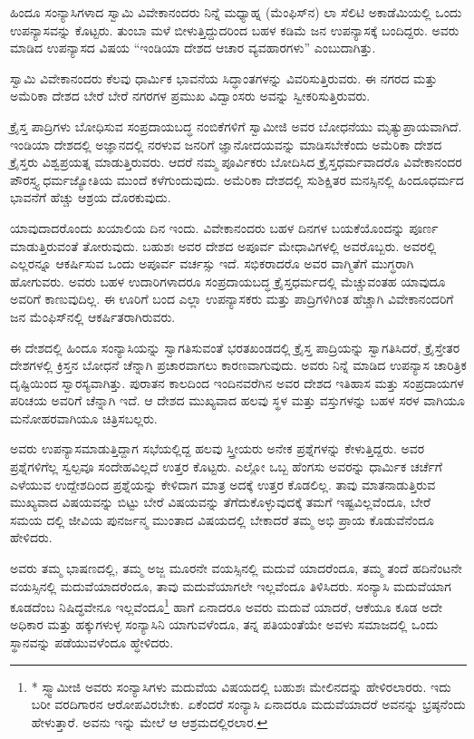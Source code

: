 ಹಿಂದೂ ಸಂನ್ಯಾಸಿಗಳಾದ ಸ್ವಾಮಿ ವಿವೇಕಾನಂದರು ನಿನ್ನೆ ಮಧ್ಯಾಹ್ನ (ಮೆಂಫಿಸ್​ನ) ಲಾ ಸೆಲಿಟಿ ಅಕಾಡೆಮಿಯಲ್ಲಿ ಒಂದು ಉಪನ್ಯಾಸವನ್ನು ಕೊಟ್ಟರು. ತುಂಬಾ ಮಳೆ ಬೀಳುತ್ತಿದ್ದುದರಿಂದ ಬಹಳ ಕಡಿಮೆ ಜನ ಉಪನ್ಯಾಸಕ್ಕೆ ಬಂದಿದ್ದರು. ಅವರು ಮಾಡಿದ ಉಪನ್ಯಾಸದ ವಿಷಯ “ಇಂಡಿಯಾ ದೇಶದ ಆಚಾರ ವ್ಯವಹಾರಗಳು” ಎಂಬುದಾಗಿತ್ತು.

ಸ್ವಾಮಿ ವಿವೇಕಾನಂದರು ಕೆಲವು ಧಾರ್ಮಿಕ ಭಾವನೆಯ ಸಿದ್ಧಾಂತಗಳನ್ನು ವಿವರಿಸುತ್ತಿರುವರು. ಈ ನಗರದ ಮತ್ತು ಅಮೆರಿಕಾ ದೇಶದ ಬೇರೆ ಬೇರೆ ನಗರಗಳ ಪ್ರಮುಖ ವಿದ್ವಾಂಸರು ಅವನ್ನು ಸ್ವೀಕರಿಸುತ್ತಿರುವರು.

ಕ್ರೈಸ್ತ ಪಾದ್ರಿಗಳು ಬೋಧಿಸುವ ಸಂಪ್ರದಾಯಬದ್ಧ ನಂಬಿಕೆಗಳಿಗೆ ಸ್ವಾಮೀಜಿ ಅವರ ಬೋಧನೆಯು ಮೃತ್ಯುಪ್ರಾಯವಾಗಿದೆ. ಇಂಡಿಯಾ ದೇಶದಲ್ಲಿ ಅಜ್ಞಾನದಲ್ಲಿ ನರಳುವ ಜನರಿಗೆ ಜ್ಞಾನೋದಯವನ್ನು ಮಾಡಿಸಬೇಕೆಂದು ಅಮೆರಿಕಾ ದೇಶದ ಕ್ರೈಸ್ತರು ವಿಶ್ವಪ್ರಯತ್ನ ಮಾಡುತ್ತಿರುವರು. ಆದರೆ ನಮ್ಮ ಪೂರ್ವಿಕರು ಬೋದಿಸಿದ ಕ್ರೈಸ್ತಧರ್ಮವಾದರೊ ವಿವೇಕಾನಂದರ ಪೌರಸ್ತ್ಯ ಧರ್ಮಜ್ಯೋತಿಯ ಮುಂದೆ ಕಳೆಗುಂದುವುದು. ಅಮೆರಿಕಾ ದೇಶದಲ್ಲಿ ಸುಶಿಕ್ಷಿತರ ಮನಸ್ಸಿನಲ್ಲಿ ಹಿಂದೂಧರ್ಮದ ಭಾವನೆಗೆ ಹೆಚ್ಚು ಆಶ್ರಯ ದೊರಕುವುದು.

ಯಾವುದಾದರೊಂದು ಖಯಾಲಿಯ ದಿನ ಇಂದು. ವಿವೇಕಾನಂದರು ಬಹಳ ದಿನಗಳ ಬಯಕೆಯೊಂದನ್ನು ಪೂರ್ಣ ಮಾಡುತ್ತಿರುವಂತೆ ತೋರುವುದು. ಬಹುಶಃ ಅವರ ದೇಶದ ಅಪೂರ್ವ ಮೇಧಾವಿಗಳಲ್ಲಿ ಅವರೊಬ್ಬರು. ಅವರಲ್ಲಿ ಎಲ್ಲರನ್ನೂ ಆಕರ್ಷಿಸುವ ಒಂದು ಅಪೂರ್ವ ವರ್ಚಸ್ಸು ಇದೆ. ಸಭಿಕರಾದರೊ ಅವರ ವಾಗ್ಮಿತೆಗೆ ಮುಗ್ಧರಾಗಿ ಹೋಗುವರು. ಅವರು ಬಹಳ ಉದಾರಿಗಳಾದರೂ ಸಂಪ್ರದಾಯಬದ್ಧ ಕ್ರೈಸ್ತಧರ್ಮದಲ್ಲಿ ಮೆಚ್ಚುವಂತಹ ಯಾವುದೂ ಅವರಿಗೆ ಕಾಣುವುದಿಲ್ಲ. ಈ ಊರಿಗೆ ಬಂದ ಎಲ್ಲಾ ಉಪನ್ಯಾಸಕರು ಮತ್ತು ಪಾದ್ರಿಗಳಿಗಿಂತ ಹೆಚ್ಚಾಗಿ ವಿವೇಕಾನಂದರಿಗೆ ಜನ ಮೆಂಫಿಸ್​ನಲ್ಲಿ ಆಕರ್ಷಿತರಾಗಿರುವರು.

ಈ ದೇಶದಲ್ಲಿ ಹಿಂದೂ ಸಂನ್ಯಾಸಿಯನ್ನು ಸ್ವಾಗತಿಸುವಂತೆ ಭರತಖಂಡದಲ್ಲಿ ಕ್ರೈಸ್ತ ಪಾದ್ರಿಯನ್ನು ಸ್ವಾಗತಿಸಿದರೆ, ಕ್ರೈಸ್ತೇತರ ದೇಶಗಳಲ್ಲಿ ಕ್ರಿಸ್ತನ ಬೋಧನೆ ಚೆನ್ನಾಗಿ ಪ್ರಚಾರವಾಗಲು ಕಾರಣವಾಗುವುದು. ಅವರು ನಿನ್ನೆ ಮಾಡಿದ ಉಪನ್ಯಾಸ ಚಾರಿತ್ರಿಕ ದೃಷ್ಟಿಯಿಂದ ಸ್ವಾರಸ್ಯವಾಗಿತ್ತು. ಪುರಾತನ ಕಾಲದಿಂದ ಇಂದಿನವರೆಗಿನ ಅವರ ದೇಶದ ಇತಿಹಾಸ ಮತ್ತು ಸಂಪ್ರದಾಯಗಳ ಪರಿಚಯ ಅವರಿಗೆ ಚೆನ್ನಾಗಿ ಇದೆ. ಆ ದೇಶದ ಮುಖ್ಯವಾದ ಹಲವು ಸ್ಥಳ ಮತ್ತು ವಸ್ತುಗಳನ್ನು ಬಹಳ ಸರಳ ವಾಗಿಯೂ ಮನೋಹರವಾಗಿಯೂ ಚಿತ್ರಿಸಬಲ್ಲರು.

ಅವರು ಉಪನ್ಯಾಸಮಾಡುತ್ತಿದ್ದಾಗ ಸಭೆಯಲ್ಲಿದ್ದ ಹಲವು ಸ್ತ್ರೀಯರು ಅನೇಕ ಪ್ರಶ್ನೆಗಳನ್ನು ಕೇಳುತ್ತಿದ್ದರು. ಅವರ ಪ್ರಶ್ನೆಗಳಿಗೆಲ್ಲ ಸ್ವಲ್ಪವೂ ಸಂದೇಹವಿಲ್ಲದೆ ಉತ್ತರ ಕೊಟ್ಟರು. ಎಲ್ಲೋ ಒಬ್ಬ ಹೆಂಗಸು ಅವರನ್ನು ಧಾರ್ಮಿಕ ಚರ್ಚೆಗೆ ಎಳೆಯುವ ಉದ್ದೇಶದಿಂದ ಪ್ರಶ್ನೆಯನ್ನು ಕೇಳಿದಾಗ ಮಾತ್ರ ಅದಕ್ಕೆ ಉತ್ತರ ಕೊಡಲಿಲ್ಲ. ತಾವು ಮಾತನಾಡುತ್ತಿರುವ ಮುಖ್ಯವಾದ ವಿಷಯವನ್ನು ಬಿಟ್ಟು ಬೇರೆ ವಿಷಯವನ್ನು ತೆಗೆದುಕೊಳ್ಳುವುದಕ್ಕೆ ತಮಗೆ ಇಷ್ಟವಿಲ್ಲವೆಂದೂ, ಬೇರೆ ಸಮಯ ದಲ್ಲಿ ಜೀವಿಯ ಪುನರ್ಜನ್ಮ ಮುಂತಾದ ವಿಷಯದಲ್ಲಿ ಬೇಕಾದರೆ ತಮ್ಮ ಅಭಿ ಪ್ರಾಯ ಕೊಡುವೆನೆಂದೂ ಹೇಳಿದರು.

ಅವರು ತಮ್ಮ ಭಾಷಣದಲ್ಲಿ, ತಮ್ಮ ಅಜ್ಜ ಮೂರನೇ ವಯಸ್ಸಿನಲ್ಲಿ ಮದುವೆ ಯಾದರೆಂದೂ, ತಮ್ಮ ತಂದೆ ಹದಿನೆಂಟನೇ ವಯಸ್ಸಿನಲ್ಲಿ ಮದುವೆಯಾದರೆಂದೂ, ತಾವು ಮದುವೆಯಾಗಲೇ ಇಲ್ಲವೆಂದೂ ತಿಳಿಸಿದರು. ಸಂನ್ಯಾಸಿ ಮದುವೆಯಾಗ ಕೂಡದೆಂಬ ನಿಷಿದ್ಧವೇನೂ ಇಲ್ಲವೆಂದೂ\footnote{* ಸ್ಸ್ವಾಮೀಜಿ ಅವರು ಸಂನ್ಯಾಸಿಗಳು ಮದುವೆಯ ವಿಷಯದಲ್ಲಿ ಬಹುಶಃ ಮೇಲಿನದನ್ನು ಹೇಳಿರಲಾರರು. ಇದು ಬರೀ ವರದಿಗಾರನ ಆರೋಪವಿರಬೇಕು. ಏಕೆಂದರೆ ಸಂನ್ಯಾಸಿ ಏನಾದರೂ ಮದುವೆಯಾದರೆ ಅವನನ್ನು ಭ್ರಷ್ಠನೆಂದು ಹೇಳುತ್ತಾರೆ. ಅವನು ಇನ್ನು ಮೇಲೆ ಆ ಆಶ್ರಮದಲ್ಲಿರಲಾರ.} ಹಾಗೆ ಏನಾದರೂ ಅವರು ಮದುವೆ ಯಾದರೆ, ಆಕೆಯೂ ಕೂಡ ಅದೇ ಅಧಿಕಾರ ಮತ್ತು ಹಕ್ಕುಗಳುಳ್ಳ ಸಂನ್ಯಾಸಿನಿ ಯಾಗುವಳೆಂದೂ, ತನ್ನ ಪತಿಯಂತೆಯೇ ಅವಳು ಸಮಾಜದಲ್ಲಿ ಒಂದು ಸ್ಥಾನವನ್ನು ಪಡೆಯುವಳೆಂದೂ ಹ್ಧೇಳಿದರು.

